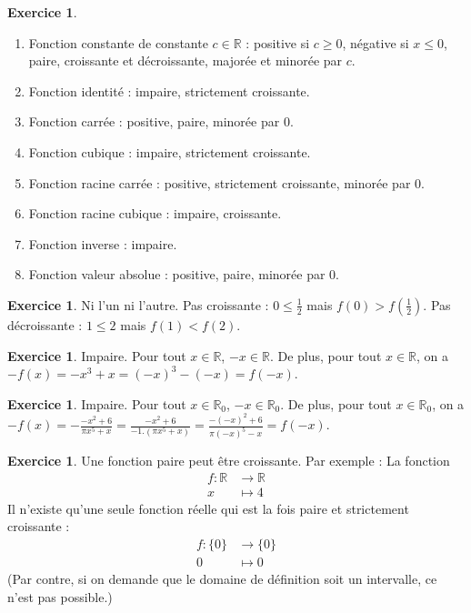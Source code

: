 \documentclass[a4paper,13pt]{scrreprt}
\theoremstyle{plain}
\theoremstyle{definition}
\newtheorem{exo}[subsection]{Exercice}
\newcommand{\rr}{\mathbb{R}}
\begin{document}
\begin{exo} ~~\\
	\begin{enumerate}
		\item Fonction constante de constante $c \in \rr$ : positive si $c \ge 0$, négative si $x \le 0$, paire, croissante et décroissante, majorée et minorée par $c$.
		\item Fonction identité : impaire, strictement croissante.
		\item Fonction carrée : positive, paire, minorée par $0$.
		\item Fonction cubique : impaire, strictement croissante.
		\item Fonction racine carrée : positive, strictement croissante, minorée par $0$.
		\item Fonction racine cubique : impaire, croissante.
		\item Fonction inverse : impaire.
		\item Fonction valeur absolue : positive, paire, minorée par $0$.
	\end{enumerate}
\end{exo}

\begin{exo} Ni l'un ni l'autre. Pas croissante : $0 \le \frac{1}{2}$ mais $f(0) > f(\frac{1}{2})$. Pas décroissante : $1 \le 2$ mais $f(1) < f(2)$.
\end{exo}

\begin{exo} Impaire. Pour tout $x \in \rr$, $-x \in \rr$. De plus, pour tout $x \in \rr$, on a $-f(x) = -x^3 + x = (-x)^3 - (-x) = f(-x)$.
\end{exo}

\begin{exo} Impaire.  Pour tout $x \in {\rr}_{0}$, $-x \in {\rr}_{0}$. De plus, pour tout $x \in {\rr}_{0}$, on a $-f(x) = -\frac{-x^2+6}{\pi x^5 +x}= \frac{-x^2+6}{-1 . (\pi x^5 +x)} = \frac{-(-x)^2+6}{\pi (-x)^5 -x} = f(-x)$.
\end{exo}

\begin{exo} Une fonction paire peut être croissante. Par exemple :
	La fonction \begin{align*}
	f : \rr &\to \rr \\
	x &\mapsto 4
	\end{align*}
	Il n'existe qu'une seule fonction réelle qui est la fois paire et strictement croissante :
	\begin{align*}
	f : \{0\} &\to \{0\} \\
	0 &\mapsto 0
	\end{align*}
	(Par contre, si on demande que le domaine de définition soit un intervalle, ce n'est pas possible.)
\end{exo}
\end{document}
